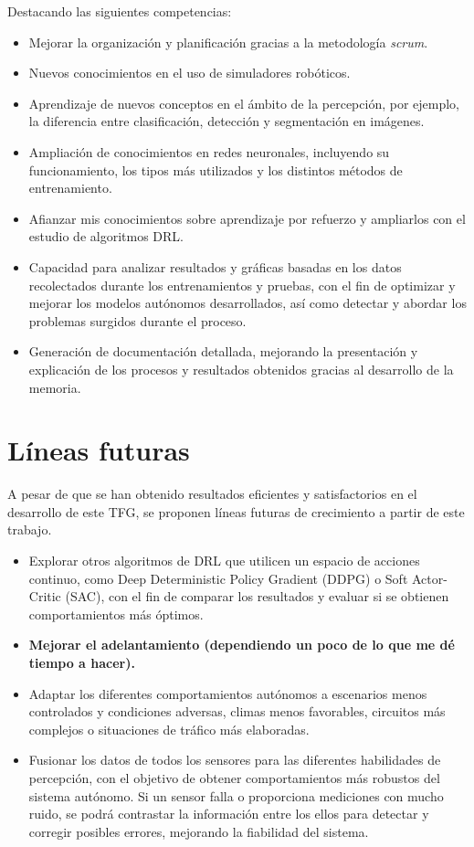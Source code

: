 Destacando las siguientes competencias:

\begin{itemize}
\item Mejorar la organización y planificación gracias a la metodología \textit{scrum}.
\item Nuevos conocimientos en el uso de simuladores robóticos.
\item Aprendizaje de nuevos conceptos en el ámbito de la percepción, por ejemplo, la diferencia entre clasificación, detección y segmentación en imágenes.
\item Ampliación de conocimientos en redes neuronales, incluyendo su funcionamiento, los tipos más utilizados y los distintos métodos de entrenamiento.
\item Afianzar mis conocimientos sobre aprendizaje por refuerzo y ampliarlos con el estudio de algoritmos \ac{DRL}.
\item Capacidad para analizar resultados y gráficas basadas en los datos recolectados durante los entrenamientos y pruebas, con el fin de optimizar y mejorar los modelos autónomos desarrollados, así como detectar y abordar los problemas surgidos durante el proceso.
\item Generación de documentación detallada, mejorando la presentación y explicación de los procesos y resultados obtenidos gracias al desarrollo de la memoria.
\end{itemize}

\section{Líneas futuras}

A pesar de que se han obtenido resultados eficientes y satisfactorios en el desarrollo de este \ac{TFG}, se proponen líneas futuras de crecimiento a partir de este trabajo. 
\begin{itemize}
\item Explorar otros algoritmos de \ac{DRL} que utilicen un espacio de acciones continuo, como Deep Deterministic Policy Gradient (DDPG) o Soft Actor-Critic (SAC), con el fin de comparar los resultados y evaluar si se obtienen comportamientos más óptimos.
\item \textbf{Mejorar el adelantamiento (dependiendo un poco de lo que me dé tiempo a hacer).}
\item Adaptar los diferentes comportamientos autónomos a escenarios menos controlados y condiciones adversas, climas menos favorables, circuitos más complejos o situaciones de tráfico más elaboradas.
\item Fusionar los datos de todos los sensores para las diferentes habilidades de percepción, con el objetivo de obtener comportamientos más robustos del sistema autónomo. Si un sensor falla o proporciona mediciones con mucho ruido, se podrá contrastar la información entre los ellos para detectar y corregir posibles errores, mejorando la fiabilidad del sistema.
\end{itemize}

